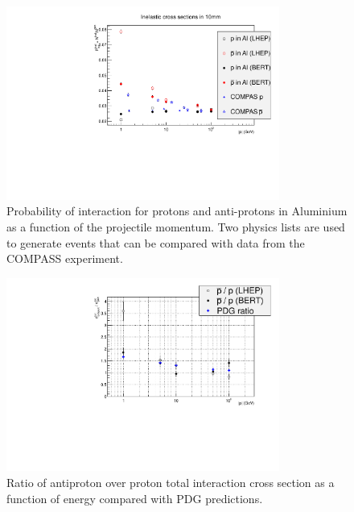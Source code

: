 \begin{center}
\begin{figure}[h]
\centering \includegraphics[width=0.8\textwidth]{Detector/figs/validation/General/pCompData_10mm.pdf}
\caption{Probability of interaction for protons and anti-protons in Aluminium as a function of the projectile momentum.
Two physics lists are used to generate events that can be compared with data from the COMPASS experiment.}
\label{fig:AllXsec}
\end{figure}

\begin{figure}[h!]
\centering \includegraphics[width=0.8\textwidth]{Detector/figs/validation/ProtonsRatio_2.pdf}
\caption{Ratio of antiproton over proton total interaction cross section as a function of energy compared with PDG predictions.}
\label{fig:ProtonsRatios}
\end{figure}


\end{center}
